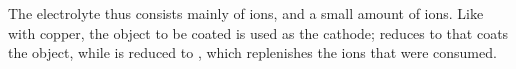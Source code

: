 			The electrolyte thus consists mainly of  ions, and a small amount of  ions. Like with copper, the object
			to be coated is used as the cathode;  reduces to  that coats the object, while  is reduced to
			, which replenishes the ions that were consumed.









